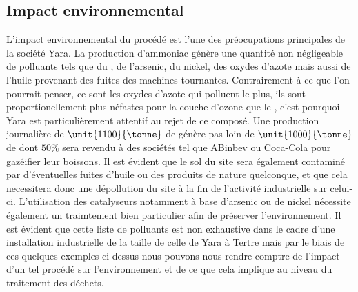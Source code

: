 \subsection*{Impact environnemental}
L'impact environnemental du procédé est l'une des préocupations principales de la société Yara. La production d'ammoniac génère une quantité non négligeable de polluants tels que du , de l'arsenic, du nickel, des oxydes d'azote mais aussi de l'huile provenant des fuites des machines tournantes. Contrairement à ce que l'on pourrait penser, ce sont les oxydes d'azote
qui polluent le plus, ils sont proportionellement plus néfastes pour la couche d'ozone que le , c'est pourquoi Yara est particulièrement attentif au rejet de ce composé. Une production journalière de $\unit{1100}{\tonne}$ de  génère pas loin de $\unit {1000}{\tonne}$ de  dont $50 \%$ sera revendu à des sociétés tel que ABinbev ou Coca-Cola pour gazéifier leur boissons. Il est évident que le sol du site sera également contaminé par d'éventuelles fuites d'huile ou des produits de nature quelconque, et que cela necessitera donc une dépollution du site à la fin de l'activité industrielle sur celui-ci. L'utilisation des catalyseurs notamment à base d'arsenic ou de nickel nécessite également un traimtement bien particulier afin de préserver l'environnement. Il est évident que cette liste de polluants est non exhaustive dans le cadre d'une installation industrielle de la taille de celle de Yara à Tertre mais par le biais de ces quelques exemples ci-dessus nous pouvons nous rendre comptre de l'impact d'un tel procédé sur l'environnement et de ce que cela implique au niveau du traitement des déchets.


